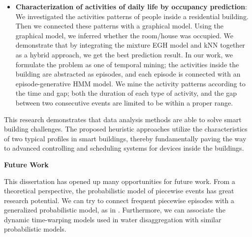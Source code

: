 \begin{itemize}
\item \textbf{Characterization of activities of daily life by occupancy prediction}: We investigated the activities patterns of people inside a residential building. Then we connected these patterns with a graphical model. Using the graphical model, we inferred whether the room/house was occupied. 
We demonstrate that by integrating the mixture EGH model and 
kNN together as a hybrid approach, we get the best prediction result. In our work, we formulate the problem as one of temporal mining; the activities inside the building are abstracted as episodes, and each episode is connected with an episode-generative HMM model. We mine the activity patterns according to the time and gap; both the duration of each type of activity, and the gap between two consecutive events are limited to be within a proper range. 
\end{itemize}

This research demonstrates that data analysis methods are able to solve smart building challenges. The proposed heuristic approaches utilize the characteristics of two typical profiles in smart buildings, thereby fundamentally paving the way to advanced controlling and scheduling systems for devices inside the buildings. 


\textbf{Future Work}

This dissertation has opened up many opportunities for future work. From a theoretical perspective, 
the probabilistic model of piecewise events has great research potential. We can try to connect frequent piecewise episodes with a generalized probabilistic model, as in \cite{laxman2005discovering}. Furthermore, we can associate the dynamic time-warping models used in water disaggregation with similar probabilistic models. 

